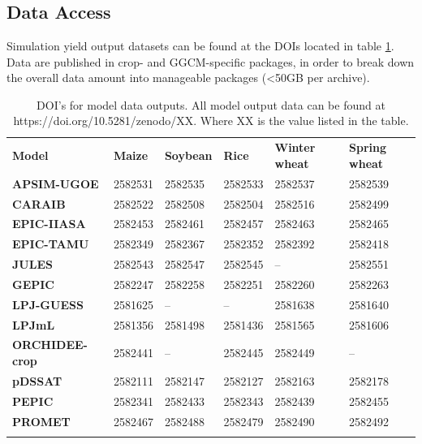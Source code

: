 \documentclass[gmd, manuscript]{copernicus} %
\begin{document}
\appendix
\section{}
\subsection{Data Access}
\label{A:1}
Simulation yield output datasets can be found at the DOIs located in table \ref{table:dataloc}. 
Data are published in crop- and GGCM-specific packages, in order to break down the overall data amount into manageable packages (<50GB per archive).

\begin{table}[h]
  \caption{DOI's for model data outputs. All model output data can be found at https://doi.org/10.5281/zenodo/XX. Where XX is the value listed in the table.} 
  \label{table:dataloc}
  \begin{tabular}{p{3cm} p{1.5cm} p{1.5cm} p{1.5cm} p{1.5cm} p{1.5cm}}
    \tophline
    {\textbf{Model}}&{\textbf{Maize}}&{\textbf{Soybean}}&{\textbf{Rice}}&{\textbf{Winter wheat}}&{\textbf{Spring wheat}}\\ \middlehline
    {\textbf{APSIM-UGOE}} & {2582531} & {2582535} & {2582533} & {2582537} & {2582539}\\ \middlehline
    {\textbf{CARAIB}} & {2582522} & {2582508} & {2582504} & {2582516} & {2582499}\\ \middlehline
    {\textbf{EPIC-IIASA}} & {2582453} & {2582461} & {2582457} & {2582463} & {2582465}\\  \middlehline
    {\textbf{EPIC-TAMU}} & {2582349} & {2582367} & {2582352} & {2582392} & {2582418}\\ \middlehline
    {\textbf{JULES}} & {2582543} & {2582547} & {2582545} & {--} & {2582551}\\ \middlehline
    {\textbf{GEPIC}} & {2582247} & {2582258} & {2582251} & {2582260} & {2582263}\\ \middlehline
    {\textbf{LPJ-GUESS}} & {2581625} & {--} & {--} & {2581638} & {2581640}\\  \middlehline
    {\textbf{LPJmL}} & {2581356} & {2581498} & {2581436} & {2581565} & {2581606}\\ \middlehline
    {\textbf{ORCHIDEE-crop}} & {2582441} & {--} & {2582445} & {2582449} & {--}\\ \middlehline
    {\textbf{pDSSAT}} & {2582111} & {2582147} & {2582127} & {2582163} & {2582178}\\ \middlehline
    {\textbf{PEPIC}} & {2582341} & {2582433} & {2582343} & {2582439} & {2582455}\\ \middlehline
    {\textbf{PROMET}} & {2582467} & {2582488} & {2582479} & {2582490} & {2582492}\\
    \bottomhline
  \end{tabular}
\end{table}
\noappendix %
\end{document}
